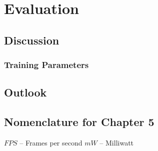\chapter{Evaluation}

\section{Discussion}
\subsection{Training Parameters}
\section{Outlook}


\section*{Nomenclature for Chapter 5}
$FPS$ – Frames per second  
$mW$ – Milliwatt  

